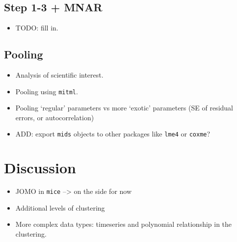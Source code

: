 \documentclass[
]{jss}
\providecommand{\tightlist}{%
  \setlength{\itemsep}{0pt}\setlength{\parskip}{0pt}}
\begin{document}
\hypertarget{step-1-3-mnar}{%
\subsection{Step 1-3 + MNAR}\label{step-1-3-mnar}}

\begin{itemize}
\tightlist
\item
  TODO: fill in.
\end{itemize}

\hypertarget{pooling}{%
\subsection{Pooling}\label{pooling}}

\begin{itemize}
\item
  Analysis of scientific interest.
\item
  Pooling using \texttt{mitml}.
\item
  Pooling `regular' parameters vs more `exotic' parameters (SE of
  residual errors, or autocorrelation)
\item
  ADD: export \texttt{mids} objects to other packages like \texttt{lme4}
  or \texttt{coxme}?
\end{itemize}

\hypertarget{discussion}{%
\section{Discussion}\label{discussion}}

\begin{itemize}
\item
  JOMO in \texttt{mice} --\textgreater{} on the side for now
\item
  Additional levels of clustering
\item
  More complex data types: timeseries and polynomial relationship in the
  clustering.
\end{itemize}

\renewcommand\refname{References}

\end{document}
